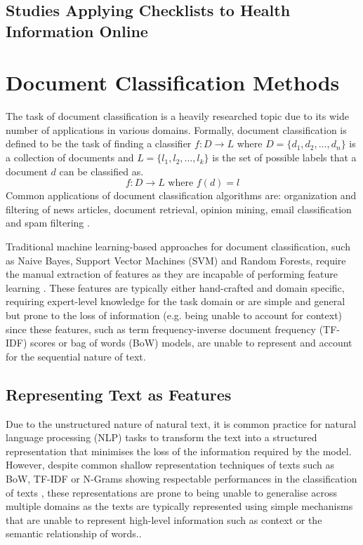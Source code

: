 \documentclass[a4paper,twoside,phd]{BYUPhys}
\begin{document}
\subsection{Studies Applying Checklists to Health Information Online}
\label{sec:ChecklistStudies}

\section{Document Classification Methods}
\label{sec:DocumentClassification}

The task of document classification is a heavily researched topic due to its wide number of applications in various domains. Formally, document classification is defined to be the task of finding a classifier $f: D \rightarrow L$ where $D = \{d_1, d_2, \dots, d_n\} $ is a collection of documents and $L = \{l_1, l_2,\dots, l_k\}$ is the set of possible labels that a document $d$ can be classified as. 
\begin{equation}
\label{eq:TextClassification}
f: D \rightarrow L \text{ where } f(d) = l
\end{equation}
Common applications of document classification algorithms are: organization and filtering of news articles, document retrieval, opinion mining, email classification and spam filtering \cite{Aggarwal2012}.

Traditional machine learning-based approaches for document classification, such as Naive Bayes, Support Vector Machines (SVM) and Random Forests, require the manual extraction of features \cite{Aggarwal2012} \cite{Allahyari2017} \cite{Korde2012} \cite{Pasupa2016} as they are incapable of performing feature learning \cite{Basheer2000}. These features are typically either hand-crafted and domain specific, requiring expert-level knowledge for the task domain \cite{Pasupa2016} or are simple and general but prone to the loss of information (e.g. being unable to account for context) since these features, such as term frequency-inverse document frequency (TF-IDF) scores or bag of words (BoW) models, are unable to represent and account for the sequential nature of text.

\subsection{Representing Text as Features}
\label{sec:TextRepresentations}

Due to the unstructured nature of natural text, it is common practice for natural language processing (NLP) tasks to transform the text into a structured representation that minimises the loss of the information required by the model. However, despite common shallow representation techniques of texts such as BoW, TF-IDF or N-Grams showing respectable performances in the classification of texts \cite{Zhang} \cite{Zhou2015}, these representations are prone to being unable to generalise across multiple domains \cite{Rosenfeld2000} as the texts are typically represented using simple mechanisms that are unable to represent high-level information such as context or the semantic relationship of words..
\end{document}
